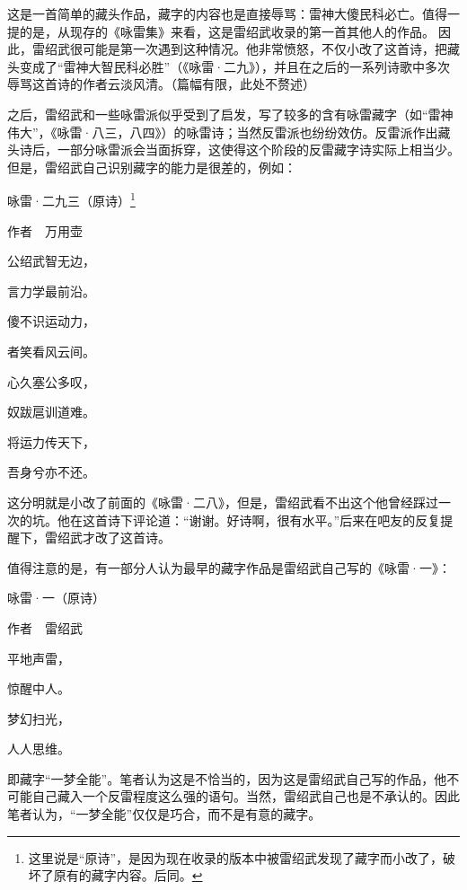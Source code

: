 \documentclass[UTF8,12pt,oneside]{ctexbook}
\begin{document}
        这是一首简单的藏头作品，藏字的内容也是直接辱骂：雷神大傻民科必亡。值得一提的是，从现存的《咏雷集》来看，这是雷绍武收录的第一首其他人的作品。因此，雷绍武很可能是第一次遇到这种情况。他非常愤怒，不仅小改了这首诗，把藏头变成了“雷神大智民科必胜”（《咏雷·二九》），并且在之后的一系列诗歌中多次辱骂这首诗的作者云淡风清。（篇幅有限，此处不赘述）

        之后，雷绍武和一些咏雷派似乎受到了启发，写了较多的含有咏雷藏字（如“雷神伟大”，《咏雷·八三，八四》）的咏雷诗；当然反雷派也纷纷效仿。反雷派作出藏头诗后，一部分咏雷派会当面拆穿，这使得这个阶段的反雷藏字诗实际上相当少。但是，雷绍武自己识别藏字的能力是很差的，例如：

        \begin{center}
            
            \heiti 咏雷·二九三（原诗）\footnote{这里说是“原诗”，是因为现在收录的版本中被雷绍武发现了藏字而小改了，破坏了原有的藏字内容。后同。}

            \songti 作者\ \ 万用壶
            
            \kaishu
            公绍武智无边，

            言力学最前沿。
            
            傻不识运动力，
            
            者笑看风云间。
            
            心久塞公多叹，
            
            奴跋扈训道难。
            
            将运力传天下，
            
            吾身兮亦不还。

        \end{center}

        这分明就是小改了前面的《咏雷·二八》，但是，雷绍武看不出这个他曾经踩过一次的坑。他在这首诗下评论道：“谢谢。好诗啊，很有水平。”后来在吧友的反复提醒下，雷绍武才改了这首诗。

        值得注意的是，有一部分人认为最早的藏字作品是雷绍武自己写的《咏雷·一》：

        \newpage

        \begin{center}
            
            \heiti 咏雷·一（原诗）

            \songti 作者\ \ 雷绍武

            \kaishu
            平地声雷，

            惊醒中人。

            梦幻扫光，

            人人思维。

        \end{center}
        即藏字“一梦全能”。笔者认为这是不恰当的，因为这是雷绍武自己写的作品，他不可能自己藏入一个反雷程度这么强的语句。当然，雷绍武自己也是不承认的。因此笔者认为，“一梦全能”仅仅是巧合，而不是有意的藏字。
\end{document}
